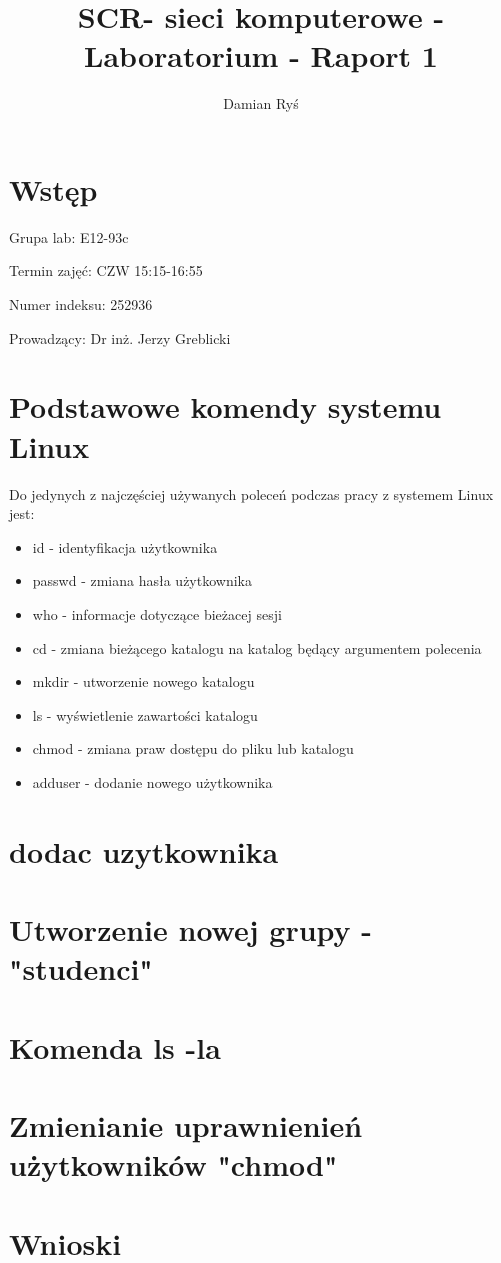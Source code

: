 \documentclass{article}
\title{SCR- sieci komputerowe - Laboratorium - Raport 1}
\author{Damian Ryś}
\begin{document}
\maketitle


\tableofcontents
\section{Wstęp}
\hspace*{0.5cm}Grupa lab: E12-93c	

Termin zajęć: CZW 15:15-16:55

Numer indeksu: 252936

Prowadzący: Dr inż. Jerzy Greblicki 
\section{Podstawowe komendy systemu Linux}
Do jedynych z najczęściej używanych poleceń podczas pracy z systemem Linux jest:
\begin{itemize}
    \item id - identyfikacja użytkownika
    \item passwd - zmiana hasła użytkownika
    \item who - informacje dotyczące bieżacej sesji
    \item cd - zmiana bieżącego katalogu na katalog będący argumentem polecenia
    \item mkdir - utworzenie nowego katalogu
    \item ls - wyświetlenie zawartości katalogu
    \item chmod - zmiana praw dostępu do pliku lub katalogu
    \item adduser - dodanie nowego użytkownika
\end{itemize}

\section{dodac uzytkownika}
\section{Utworzenie nowej grupy - "studenci"}

\section{Komenda ls -la}

\section{Zmienianie uprawnienień użytkowników "chmod" }

\section{Wnioski}
\end{document}
